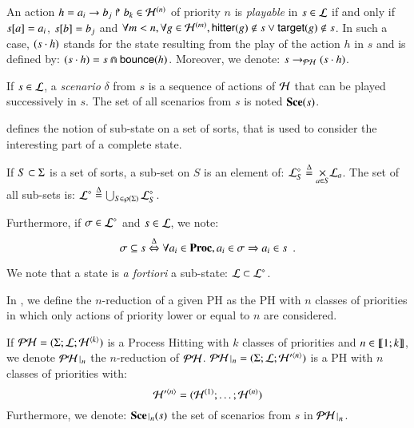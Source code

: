 \begin{definition}
\label{def:play}
  An action $h = \PHhit{a_i}{b_j}{b_k} \in \PHa^{(n)}$ of priority $n$ is \emph{playable} in $s \in \PHl$
  if and only if $\PHget{s}{a} = a_i$, $\PHget{s}{b} = b_j$ and $\forall m < n, \forall g \in \PHa^{(m)}, \PHhitter(g) \notin s \vee \PHtarget(g) \notin s$.
  In such a case, $(s \PHplay h)$ stands for the state resulting from the play of the action $h$ in $s$ and is defined by: $(s \PHplay h) = s \Cap \PHbounce(h)$.
  Moreover, we denote: $s \PHPtrans (s \PHplay h)$.

  If $s \in \PHl$,
  a \emph{scenario} $\delta$ from $s$ is a sequence of actions of $\PHh$ that can be played successively in $s$.
  The set of all scenarios from $s$ is noted $\Sce(s)$.
\end{definition}

 defines the notion of sub-state on a set of sorts,
that is used to consider the interesting part of a complete state.
\begin{definition}
\label{def:substate}
  If $S \subset \PHs$ is a set of sorts, a sub-set on $S$ is an element of:
  $\PHsubl[\PHl]_S \DEF \bigtimes{a \in S} \PHl_a$.
  The set of all sub-sets is:
  $\PHsubl[\PHl] \DEF \bigcup_{S \in\powerset(\PHs)} \PHsubl[\PHl]_S$.
  
  \noindent
  Furthermore, if $\mysigma \in \PHsubl[\PHl]$ and $s \in \PHl$, we note:
    \[\mysigma \subseteq s \EQDEF \forall a_i \in \Proc, a_i \in \mysigma \Rightarrow a_i \in s \enspace.\]
\end{definition}
We note that a state is \textit{a fortiori} a sub-state: $\PHl \subset \PHsubl[\PHl]$.

In , we define the $n$-reduction of a given PH as the PH with $n$ classes of priorities in which only actions of priority lower or equal to $n$ are considered.
\begin{definition}[PH $n$-reduction]
\label{def:restriction}
  If $\PH = (\PHs; \PHl; \PHa^{\langle k \rangle})$ is a Process Hitting with $k$ classes of priorities and $n \in \segm{1}{k}$, we denote $\restriction{\PH}{n}$
  the $n$-reduction of $\PH$.
  $\restriction{\PH}{n} = (\PHs; \PHl; \PHa'^{\langle n \rangle})$ is a PH with $n$ classes of priorities with:
  $$\PHa'^{\langle n \rangle} = (\PHa^{(1)}; \dots; \PHa^{(n)})$$
  Furthermore, we denote: $\restriction{\Sce}{n}(s)$ the set of scenarios from $s$ in $\restriction{\PH}{n}$.
\end{definition}



